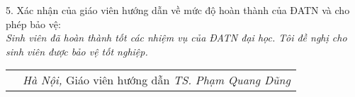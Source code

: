 {5. Xác nhận của giáo viên hướng dẫn về mức độ hoàn thành của ĐATN và cho phép
bảo vệ:\\
\textit{Sinh viên đã hoàn thành tốt các nhiệm vụ của ĐATN đại học. Tôi đề nghị
        cho sinh viên được bảo vệ tốt nghiệp.}

\begin{table}[H]
    \centering
    \begin{tabular}{P{0.45\textwidth} P{0.45\textwidth}}
        & \textit{Hà Nội, }\newline
            Giáo viên hướng dẫn\newline
            \newline
            \newline
          \textit{TS. Phạm Quang Dũng}\\
    \end{tabular}
\end{table}

}%
\restoregeometry
